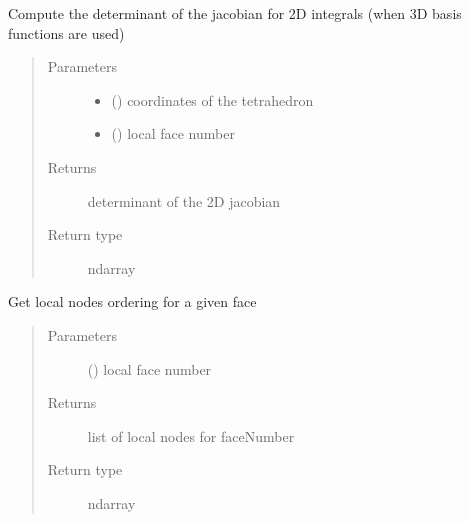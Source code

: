 \documentclass[letterpaper,10pt,english]{sphinxmanual}
\begin{document}

\begin{fulllineitems}
\label{\detokenize{petgem/hvfem:petgem.hvfem.get2DJacobDet}}
Compute the determinant of the jacobian for 2D integrals (when 3D basis functions are used)
\begin{quote}\begin{description}
\item[{Parameters}] \leavevmode\begin{itemize}
\item {} 
 () \textendash{} coordinates of the tetrahedron

\item {} 
 () \textendash{} local face number

\end{itemize}

\item[{Returns}] \leavevmode
determinant of the 2D jacobian

\item[{Return type}] \leavevmode
ndarray

\end{description}\end{quote}

\end{fulllineitems}


\begin{fulllineitems}
\label{\detokenize{petgem/hvfem:petgem.hvfem.getFaceByLocalNodes}}
Get local nodes ordering for a given face
\begin{quote}\begin{description}
\item[{Parameters}] \leavevmode
{} () \textendash{} local face number

\item[{Returns}] \leavevmode
list of local nodes for faceNumber

\item[{Return type}] \leavevmode
ndarray

\end{description}\end{quote}

\end{fulllineitems}
\end{document}
